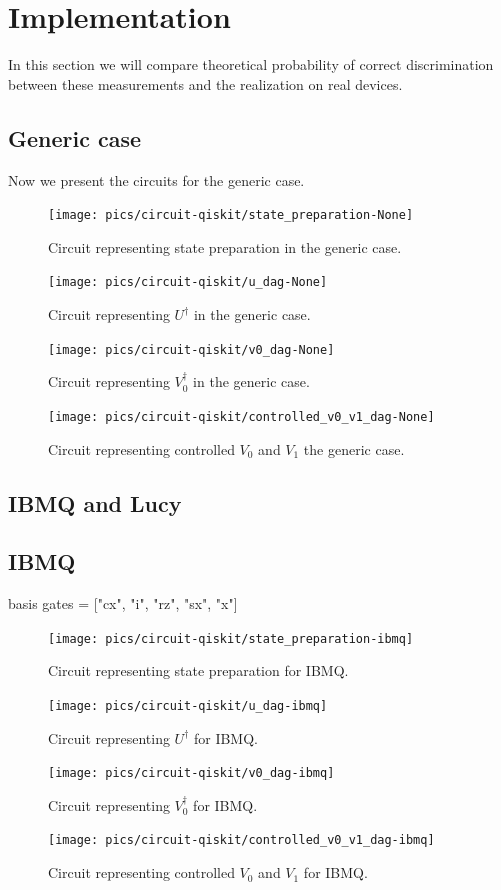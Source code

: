 \documentclass[preprint,12pt, a4paper]{elsarticle}
\newcommand{\1}{{\rm 1\hspace{-0.9mm}l}}
\begin{document}
\section{Implementation}
In this section we will compare theoretical probability of correct 
discrimination between these measurements and the realization on real devices.

\subsection{Generic case}
Now we present the circuits for the generic case.
\begin{figure}[h!]
\centering
\texttt{[image: pics/circuit-qiskit/state\_preparation-None]}
\caption{Circuit representing state preparation in the  generic case.}
\end{figure}
\begin{figure}[h!]
\centering
\texttt{[image: pics/circuit-qiskit/u\_dag-None]}
\caption{Circuit representing $U^\dagger$ in the generic case.}
\end{figure}
\begin{figure}[h!]
\centering
\texttt{[image: pics/circuit-qiskit/v0\_dag-None]}
\caption{Circuit representing $V_0^\dagger$ in the generic case.}
\end{figure}
\begin{figure}[h!]
\centering
\texttt{[image: pics/circuit-qiskit/controlled\_v0\_v1\_dag-None]}
\caption{Circuit representing controlled $V_0$ and $V_1$ the generic case.}
\end{figure}



\subsection{IBMQ and Lucy}

\subsection{IBMQ}
 basis gates = ["cx", "i", "rz", "sx", "x"]
\begin{figure}[h!]
\centering
\texttt{[image: pics/circuit-qiskit/state\_preparation-ibmq]}
\caption{Circuit representing state preparation for IBMQ.}
\end{figure}
\begin{figure}[h!]
\centering
\texttt{[image: pics/circuit-qiskit/u\_dag-ibmq]}
\caption{Circuit representing $U^\dagger$ for IBMQ.}
\end{figure}
\begin{figure}[h!]
\centering
\texttt{[image: pics/circuit-qiskit/v0\_dag-ibmq]}
\caption{Circuit representing $V_0^\dagger$ for IBMQ.}
\end{figure}
\begin{figure}[h!]
\centering
\texttt{[image: pics/circuit-qiskit/controlled\_v0\_v1\_dag-ibmq]}
\caption{Circuit representing controlled $V_0$ and $V_1$ for IBMQ.}
\end{figure}
\end{document}
